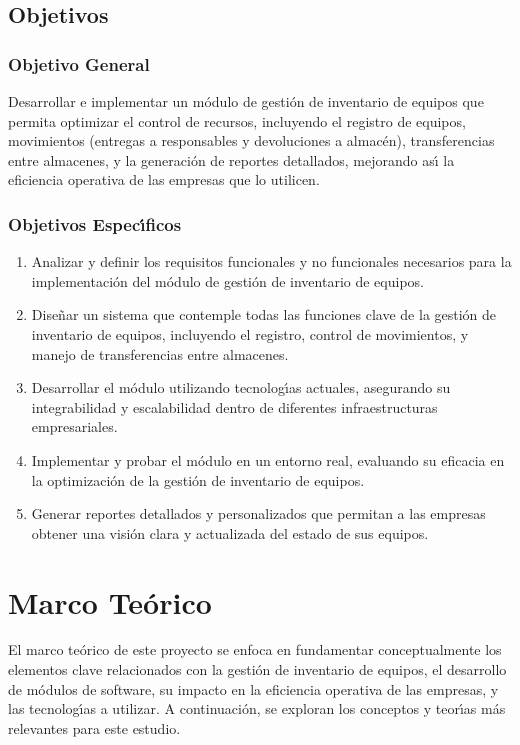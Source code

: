 \documentclass[stu, 12pt, letterpaper, donotrepeattitle, floatsintext, natbib]{apa7}
\begin{document}
\subsection{Objetivos}
\subsubsection{Objetivo General}
Desarrollar e implementar un m\'odulo de gesti\'on de inventario de equipos que permita optimizar el control de recursos, incluyendo el registro de equipos, movimientos (entregas a responsables y devoluciones a almac\'en),
transferencias entre almacenes, y la generaci\'on de reportes detallados, mejorando as\'{\i} la eficiencia operativa de las empresas que lo utilicen.
\subsubsection{Objetivos Espec\'{\i}ficos}
\begin{enumerate}
    \item Analizar y definir los requisitos funcionales y no funcionales necesarios para la implementaci\'on del m\'odulo de gesti\'on de inventario de equipos.
    \item Dise\~{n}ar un sistema que contemple todas las funciones clave de la gesti\'on de inventario de equipos, incluyendo el registro, control de movimientos, y manejo de transferencias entre almacenes.
    \item Desarrollar el m\'odulo utilizando tecnolog\'{\i}as actuales, asegurando su integrabilidad y escalabilidad dentro de diferentes infraestructuras empresariales.
    \item Implementar y probar el m\'odulo en un entorno real, evaluando su eficacia en la optimizaci\'on de la gesti\'on de inventario de equipos.
    \item Generar reportes detallados y personalizados que permitan a las empresas obtener una visi\'on clara y actualizada del estado de sus equipos.
\end{enumerate}
\newpage
\section{Marco Te\'orico}
El marco te\'orico de este proyecto se enfoca en fundamentar conceptualmente los elementos clave relacionados con la gesti\'on de inventario de equipos, el desarrollo de m\'odulos de software, su impacto en la eficiencia
operativa de las empresas, y las tecnolog\'{\i}as a utilizar. A continuaci\'on, se exploran los conceptos y teor\'{\i}as m\'as relevantes para este estudio.
\end{document}
